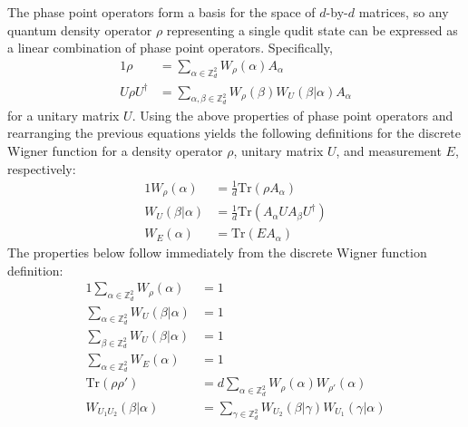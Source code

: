 \documentclass[../3Wworkreport.tex]{subfiles}
\begin{document}
The phase point operators form a basis for the space of $d$-by-$d$ matrices, so any quantum density operator $\rho$ representing a single qudit state can be expressed as a linear combination of phase point operators. Specifically,
\begin{alignat}{1}
	\rho &= \sum\limits_{\alpha \in \mathbb{Z}_d^2} W_\rho(\alpha) A_\alpha\\
	U \rho U^\dag &= \sum\limits_{\alpha,\beta \in \mathbb{Z}_d^2} W_\rho(\beta) W_U(\beta | \alpha) A_\alpha
\end{alignat}
for a unitary matrix $U$. Using the above properties of phase point operators and rearranging the previous equations yields the following definitions for the discrete Wigner function for a density operator $\rho$, unitary matrix $U$, and measurement $E$, respectively:
\begin{alignat}{1}
	W_\rho(\alpha) &= \frac{1}{d}\text{Tr}(\rho A_\alpha)\\
	W_U(\beta | \alpha) &= \frac{1}{d}\text{Tr}(A_\alpha U A_\beta U^\dag)\\
	W_{E}(\alpha) &= \text{Tr}(E A_\alpha)
\end{alignat}
The properties below follow immediately from the discrete Wigner function definition:
\begin{alignat}{1}
	\sum\limits_{\alpha \in \mathbb{Z}_d^2} W_\rho(\alpha) &= 1\\
	\sum\limits_{\alpha \in \mathbb{Z}_d^2} W_U(\beta | \alpha) &= 1\\
	\sum\limits_{\beta \in \mathbb{Z}_d^2} W_U(\beta | \alpha) &= 1\\
	\sum\limits_{\alpha \in \mathbb{Z}_d^2} W_E(\alpha) &= 1\\
	\text{Tr}(\rho \rho') &= d \sum\limits_{\alpha \in \mathbb{Z}_d^2} W_\rho(\alpha) W_{\rho'}(\alpha)\\
	W_{U_1 U_2}(\beta | \alpha) &= \sum\limits_{\gamma \in \mathbb{Z}_d^2} W_{U_2}(\beta | \gamma) W_{U_1}(\gamma | \alpha)
\end{alignat}
\end{document}
